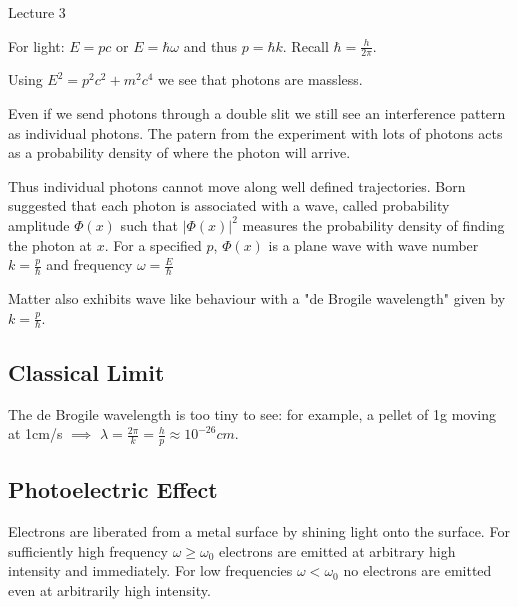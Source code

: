 \begin{center}

Lecture 3

\end{center}

For light: $E=pc$ or $E = \hbar \omega$ and thus $p=\hbar k$. Recall $\hbar = \frac{h}{2\pi}$.

Using $E^2 = p^2 c^2 + m^2 c^4$ we see that photons are massless.

Even if we send photons through a double slit we still see an interference pattern as individual photons. The patern from the experiment with lots of photons acts as a probability density of where the photon will arrive.

Thus individual photons cannot move along well defined trajectories. Born suggested that each photon is associated with a wave, called probability amplitude $\Phi(x)$ such that $|\Phi(x)|^2$ measures the probability density of finding the photon at $x$. For a specified $p$, $\Phi(x)$ is a plane wave with wave number $k = \frac{p}{\hbar}$ and frequency $\omega = \frac{E}{\hbar}$

\vspace{\baselineskip}

Matter also exhibits wave like behaviour with a "de Brogile wavelength" given by $k=\frac{p}{\hbar}$. 

\subsection{Classical Limit}

The de Brogile wavelength is too tiny to see: for example, a pellet of 1g moving at 1cm/s $\implies$ $\lambda = \frac{2\pi}{k} = \frac{h}{p} \approx 10^{-26} cm$.

\subsection{Photoelectric Effect}

Electrons are liberated from a metal surface by shining light onto the surface. For sufficiently high frequency $\omega \geq \omega_0$ electrons are emitted at arbitrary high intensity and immediately. For low frequencies $\omega < \omega_0$ no electrons are emitted even at arbitrarily high intensity.